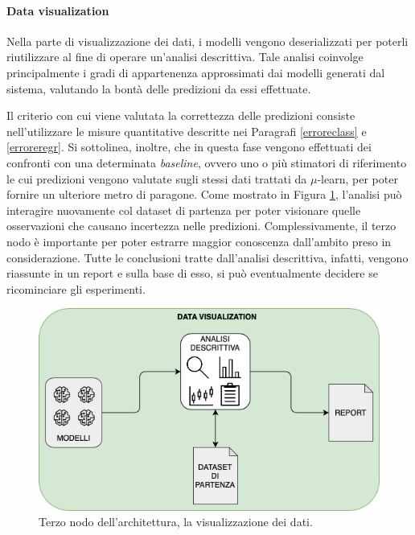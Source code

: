 \documentclass[12pt]{report}
\theoremstyle{definition}
\begin{document}
\paragraph{Data visualization} 
Nella parte di visualizzazione dei dati, i modelli vengono deserializzati per poterli riutilizzare al fine di operare un'analisi descrittiva.
Tale analisi coinvolge principalmente i gradi di appartenenza approssimati dai modelli generati dal sistema, valutando la bontà delle predizioni da essi effettuate.

Il criterio con cui viene valutata la correttezza delle predizioni consiste nell'utilizzare le misure quantitative descritte nei Paragrafi \ref{erroreclass} e \ref{erroreregr}. Si sottolinea, inoltre, che in questa fase vengono effettuati dei confronti con una determinata \textit{baseline}, ovvero uno o più stimatori di riferimento le cui predizioni vengono valutate sugli stessi dati trattati da $\mu$-learn, per poter fornire un ulteriore metro di paragone. Come mostrato in Figura \ref{datavisualization}, l'analisi può interagire nuovamente col dataset di partenza per poter visionare quelle osservazioni che causano incertezza nelle predizioni. Complessivamente, il terzo nodo è importante per poter estrarre maggior conoscenza dall'ambito preso in considerazione. Tutte le conclusioni tratte dall'analisi descrittiva, infatti, vengono riassunte in un report e sulla base di esso, si può eventualmente decidere se ricominciare gli esperimenti.

\begin{figure}
    \centering
    \includegraphics[scale=0.6]{images/datavisualizationmodule.png}
    \caption{Terzo nodo dell'architettura, la visualizzazione dei dati.}
    \label{datavisualization}
\end{figure}
\end{document}
